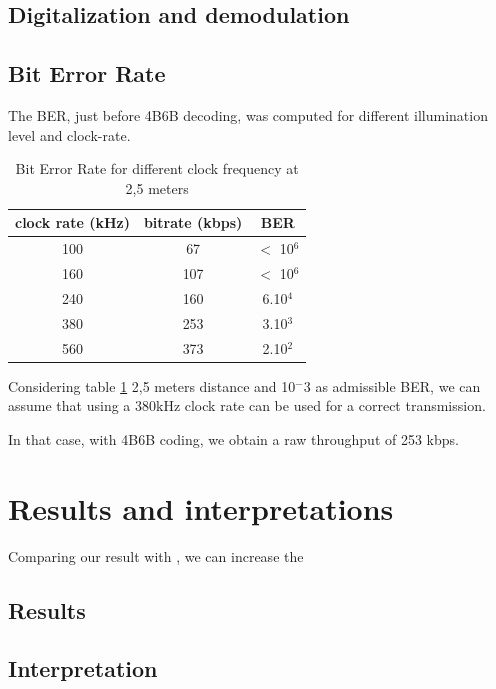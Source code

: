 \subsection{Digitalization and demodulation}


\subsection{Bit Error Rate}

The BER, just before 4B6B decoding, was computed for different illumination level and clock-rate.

\begin{table}[htbp]
\begin{center}
\begin{tabular}{|c|c|c|}
  \hline
  clock rate (kHz) & bitrate (kbps) & BER \\
  \hline
  100 & 67 & $<$ 10$^6$ \\
  160 & 107 & $<$ 10$^6$ \\
  240 & 160 & 6.10$^4$ \\
  380 & 253 & 3.10$^3$ \\
  560 & 373 & 2.10$^2$ \\
  \hline
\end{tabular}
\end{center}
\caption{Bit Error Rate for different clock frequency at 2,5 meters}
\label{tab:ber}
\end{table}

Considering table \ref{tab:ber} 2,5 meters distance and 10$^-3$ as admissible BER, we can assume that using a 380kHz clock rate can be used for a correct transmission. 

In that case, with 4B6B coding, we obtain a raw throughput of 253 kbps. 

\section{Results and interpretations}

Comparing our result with \citep{phycomp}, we can increase the 
\subsection{Results}
\subsection{Interpretation}